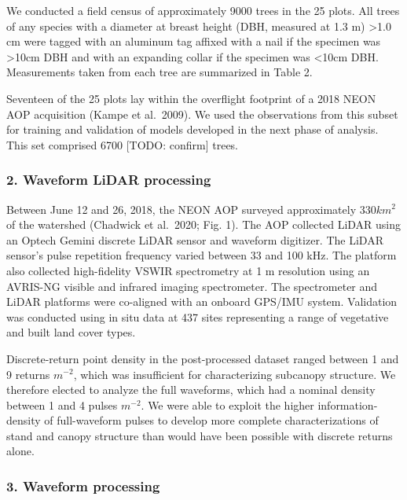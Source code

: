 \documentclass[
  12pt,
]{article}
\begin{document}
We conducted a field census of approximately 9000 trees in the 25 plots.
All trees of any species with a diameter at breast height (DBH, measured
at 1.3 m) \textgreater1.0 cm were tagged with an aluminum tag affixed
with a nail if the specimen was \textgreater10cm DBH and with an
expanding collar if the specimen was \textless10cm DBH. Measurements
taken from each tree are summarized in Table 2.

Seventeen of the 25 plots lay within the overflight footprint of a 2018
NEON AOP acquisition (Kampe et al.~2009). We used the observations from
this subset for training and validation of models developed in the next
phase of analysis. This set comprised 6700 {[}TODO: confirm{]} trees.

\hypertarget{waveform-lidar-processing}{%
\subsubsection{2. Waveform LiDAR
processing}\label{waveform-lidar-processing}}

Between June 12 and 26, 2018, the NEON AOP surveyed approximately
\(330 km^2\) of the watershed (Chadwick et al.~2020; Fig. 1). The AOP
collected LiDAR using an Optech Gemini discrete LiDAR sensor and
waveform digitizer. The LiDAR sensor's pulse repetition frequency varied
between 33 and 100 kHz. The platform also collected high-fidelity VSWIR
spectrometry at 1 m resolution using an AVRIS-NG visible and infrared
imaging spectrometer. The spectrometer and LiDAR platforms were
co-aligned with an onboard GPS/IMU system. Validation was conducted
using in situ data at 437 sites representing a range of vegetative and
built land cover types.

Discrete-return point density in the post-processed dataset ranged
between 1 and 9 returns \(m^{-2}\), which was insufficient for
characterizing subcanopy structure. We therefore elected to analyze the
full waveforms, which had a nominal density between 1 and 4 pulses
\(m^{-2}\). We were able to exploit the higher information-density of
full-waveform pulses to develop more complete characterizations of stand
and canopy structure than would have been possible with discrete returns
alone.

\hypertarget{waveform-processing}{%
\subsubsection{3. Waveform processing}\label{waveform-processing}}
\end{document}
